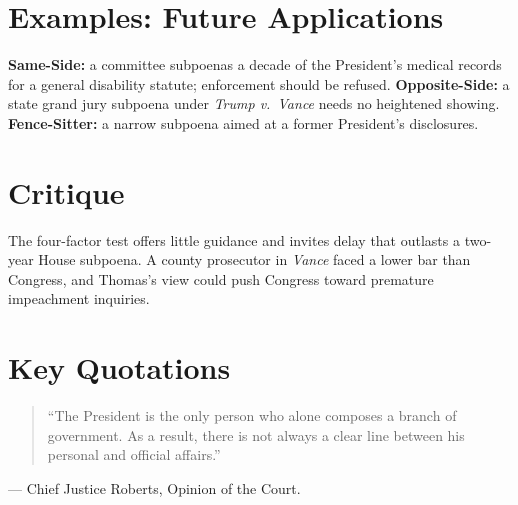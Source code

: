 \documentclass[12pt]{article}
\begin{document}
\section{Examples: Future Applications}
\textbf{Same-Side:} a committee subpoenas a decade of the President's medical records for a general disability statute; enforcement should be refused. \textbf{Opposite-Side:} a state grand jury subpoena under \textit{Trump v.\ Vance} needs no heightened showing. \textbf{Fence-Sitter:} a narrow subpoena aimed at a former President's disclosures.

\section{Critique}
The four-factor test offers little guidance and invites delay that outlasts a two-year House subpoena. A county prosecutor in \textit{Vance} faced a lower bar than Congress, and Thomas's view could push Congress toward premature impeachment inquiries.

\section{Key Quotations}
\begin{quote}
``The President is the only person who alone composes a branch of government. As a result, there is not always a clear line between his personal and official affairs.''
\end{quote}
\noindent --- Chief Justice Roberts, Opinion of the Court.
\end{document}
